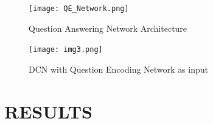 \documentclass[a4paper, 11pt]{article}
\begin{document}
\begin{figure}[h!]
  \center
  \texttt{[image: QE\_Network.png]}
  \caption{Question Answering Network Architecture}
  \label{fig:QE_Arch}
\end{figure}

\begin{figure}[h!]
  \center
  \texttt{[image: img3.png]}
  \caption{DCN with Question Encoding Network as input}
  \label{fig:DCN_QE}
\end{figure}



\section{RESULTS}

\begin{figure}[!h]
\begin{floatrow}
\end{floatrow}
\end{figure}
\end{document}
